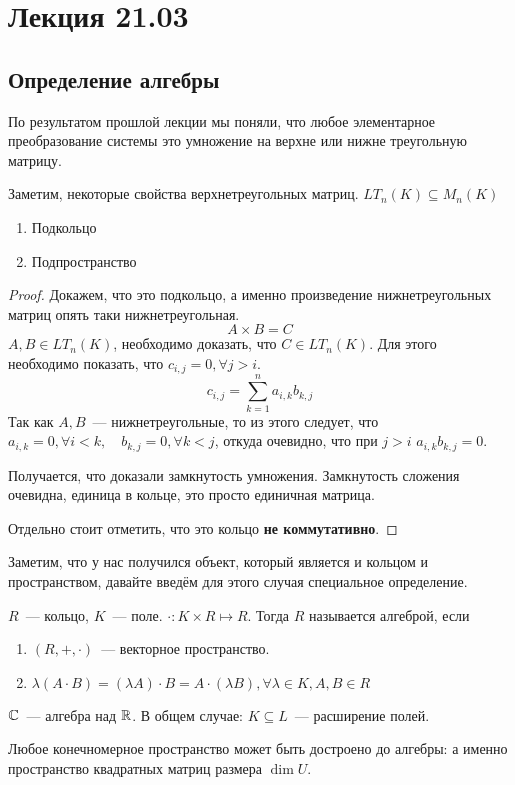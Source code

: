 \section{Лекция 21.03}
\subsection{Определение алгебры}
\begin{remark}
    По результатом прошлой лекции мы поняли,
    что любое элементарное преобразование системы
    это умножение на верхне или нижне треугольную матрицу.
\end{remark}
\begin{remark}
    Заметим, некоторые свойства верхнетреугольных матриц. $LT_n(K)\subseteq M_n(K)$ 
    \begin{enumerate}
        \item Подкольцо
        \item Подпространство
    \end{enumerate}
\end{remark}
\begin{proof}
    Докажем, что это подкольцо, а именно произведение нижнетреугольных матриц опять таки
    нижнетреугольная. 
    \[
        A \times B = C
    \] $A, B \in LT_n(K)$, необходимо доказать, что $C\in LT_n(K)$. 
    Для этого необходимо показать, что $c_{i, j} = 0, \forall j > i$.
    \[
        c_{i,j} = \sum\limits_{k=1}^{n}{a_{i,k} b_{k,j}}
    \]
    Так как $A, B$~--- нижнетреугольные, то из этого следует, что 
    $a_{i,k} = 0, \forall i < k,\quad b_{k, j} = 0, \forall k < j$, откуда
    очевидно, что при $j > i$ $a_{i,k}b_{k,j} = 0$.

    Получается, что доказали замкнутость умножения. Замкнутость сложения очевидна,
    единица в кольце, это просто единичная матрица. 

    Отдельно стоит отметить, что это кольцо \textbf{не коммутативно}.
\end{proof} 
\begin{motivation}
    Заметим, что у нас получился объект, который является и кольцом и пространством, давайте
    введём для этого случая специальное определение.
\end{motivation}
\begin{definition}
    $R$~--- кольцо, $K$~--- поле.
    $\cdot\colon K\times R\mapsto R$. Тогда $R$ называется алгеброй, если 
     \begin{enumerate}
         \item $\left(R,+,\cdot\right)$~--- векторное пространство.
         \item $\lambda(A\cdot B) = (\lambda A)\cdot B = A\cdot (\lambda B), \forall \lambda\in K, A,B\in R$
    \end{enumerate}
\end{definition}
\begin{example}
    $\mathbb{C}$~--- алгебра над $\mathbb{R}$. В общем случае: $K\subseteq L$~--- расширение полей.
\end{example}
\begin{statement}
     Любое конечномерное пространство может быть достроено до алгебры:
     а именно пространство квадратных матриц размера $\dim U$.
\end{statement}
